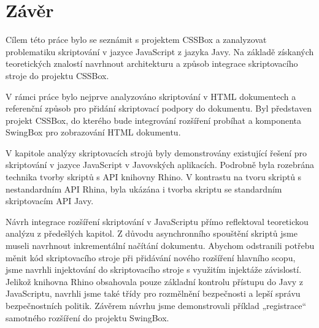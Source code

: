\chapter{Závěr}
\label{Chapter.Final}

Cílem této práce bylo se seznámit s projektem CSSBox a zanalyzovat problematiku skriptování v jazyce JavaScript z jazyka Javy. Na základě získaných teoretických znalostí navrhnout architekturu a způsob integrace skriptovacího stroje do projektu CSSBox.

V rámci práce bylo nejprve analyzováno skriptování v HTML dokumentech a referenční způsob pro přidání skriptovací podpory do dokumentu. Byl představen projekt CSSBox, do kterého bude integrování rozšíření probíhat a komponenta SwingBox pro zobrazování HTML dokumentu.

V kapitole analýzy skriptovacích strojů byly demonstrovány existující řešení pro skriptování v jazyce JavaScript v Javovských aplikacích. Podrobně byla rozebrána technika tvorby skriptů s API knihovny Rhino. V kontrastu na tvoru skriptů s nestandardním API Rhina, byla ukázána i tvorba skriptu se standardním skriptovacím API Javy.

Návrh integrace rozšíření skriptování v JavaScriptu přímo reflektoval teoretickou analýzu z předešlých kapitol. Z důvodu asynchronního spouštění skriptů jsme museli navrhnout inkrementální načítání dokumentu. Abychom odstranili potřebu měnit kód skriptovacího stroje při přidávání nového rozšíření hlavního scopu, jsme navrhli injektování do skriptovacího stroje s využitím injektáže závislostí. Jelikož knihovna Rhino obsahovala pouze základní kontrolu přístupu do Javy z JavaScriptu, navrhli jsme také třídy pro rozmělnění bezpečnosti a lepší správu bezpečnostních politik. Závěrem návrhu jsme demonstrovali příklad „registrace“ samotného rozšíření do projektu SwingBox.
